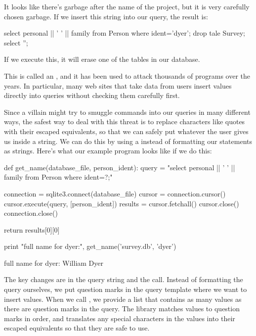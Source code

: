 It looks like there's garbage after the name of the project, but it is
very carefully chosen garbage. If we insert this string into our query,
the result is:

\begin{VerbIn}
select personal || ' ' || family from Person where ident='dyer'; drop tale Survey; select '';
\end{VerbIn}

If we execute this, it will erase one of the tables in our database.

This is called an , and it has been used to attack thousands of programs over the
years. In particular, many web sites that take data from users insert
values directly into queries without checking them carefully first.

Since a villain might try to smuggle commands into our queries in many
different ways, the safest way to deal with this threat is to replace
characters like quotes with their escaped equivalents, so that we can
safely put whatever the user gives us inside a string. We can do this by
using a  instead of
formatting our statements as strings. Here's what our example program
looks like if we do this:

\begin{VerbIn}
def get_name(database_file, person_ident):
    query = "select personal || ' ' || family from Person where ident=?;"

    connection = sqlite3.connect(database_file)
    cursor = connection.cursor()
    cursor.execute(query, [person_ident])
    results = cursor.fetchall()
    cursor.close()
    connection.close()

    return results[0][0]

print "full name for dyer:", get_name('survey.db', 'dyer')
\end{VerbIn}

\begin{VerbOut}
full name for dyer: William Dyer
\end{VerbOut}

The key changes are in the query string and the  call.
Instead of formatting the query ourselves, we put question marks in the
query template where we want to insert values. When we call
, we provide a list that contains as many values as
there are question marks in the query. The library matches values to
question marks in order, and translates any special characters in the
values into their escaped equivalents so that they are safe to use.

